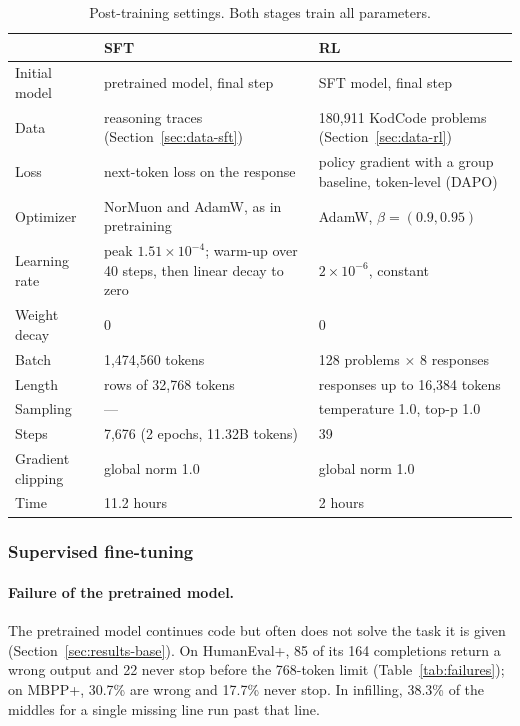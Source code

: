 \documentclass[sigconf,nonacm,balance=false]{acmart}
\providecommand{\arraybackslash}{\let\\\tabularnewline}
\begin{document}
\begin{table}
  \caption{Post-training settings. Both stages train all parameters.}
  \label{tab:post-train}
  \small
  \setlength{\tabcolsep}{4pt}
  \begin{tabular}{>{\raggedright\arraybackslash}p{1.9cm}>{\raggedright\arraybackslash}p{2.8cm}%
    >{\raggedright\arraybackslash}p{2.8cm}}
    \toprule
     & SFT & RL \\
    \midrule
    Initial model & pretrained model, final step & SFT model, final step \\
    Data & reasoning traces (Section~\ref{sec:data-sft}) & 180,911 KodCode problems (Section~\ref{sec:data-rl}) \\
    Loss & next-token loss on the response & policy gradient with a group baseline, token-level (DAPO) \\
    Optimizer & NorMuon and AdamW, as in pretraining & AdamW, $\beta = (0.9, 0.95)$ \\
    Learning rate & peak $1.51 \times 10^{-4}$; warm-up over 40 steps, then linear decay to zero
      & $2 \times 10^{-6}$, constant \\
    Weight decay & 0 & 0 \\
    Batch & 1,474,560 tokens & 128 problems $\times$ 8 responses \\
    Length & rows of 32,768 tokens & responses up to 16,384 tokens \\
    Sampling & --- & temperature 1.0, top-p 1.0 \\
    Steps & 7,676 (2 epochs, 11.32B tokens) & 39 \\
    Gradient clipping & global norm 1.0 & global norm 1.0 \\
    Time & 11.2 hours & 2 hours \\
    \bottomrule
  \end{tabular}
\end{table}

\subsubsection{Supervised fine-tuning}
\label{sec:sft}

\paragraph{Failure of the pretrained model.} The pretrained model continues code but often does not solve the task it
is given (Section~\ref{sec:results-base}). On HumanEval+, 85 of its 164 completions return a wrong output and 22 never
stop before the 768-token limit (Table~\ref{tab:failures}); on MBPP+, 30.7\% are wrong and 17.7\% never stop. In
infilling, 38.3\% of the middles for a single missing line run past that line.
\end{document}

